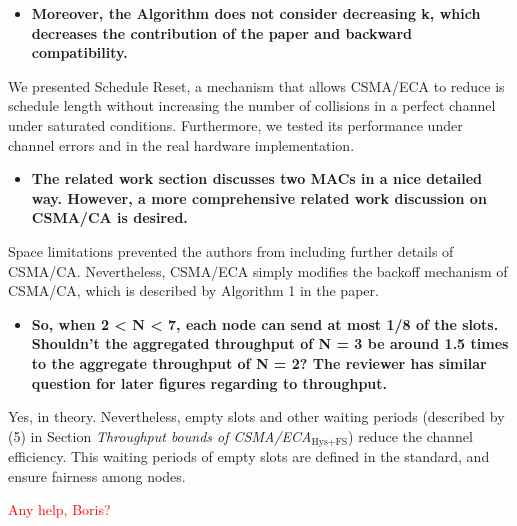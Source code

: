 \documentclass[]{article}
\begin{document}
		\begin{itemize}
			\item {\bfseries Moreover, the Algorithm does not consider decreasing k, which decreases the contribution of the paper and backward compatibility.}
		\end{itemize}
		
		We presented Schedule Reset, a mechanism that allows CSMA/ECA to reduce is schedule length without increasing the number of collisions in a perfect channel under saturated conditions. Furthermore, we tested its performance under channel errors and in the real hardware implementation.
		
		\begin{itemize}
			\item {\bfseries The related work section discusses two MACs in a nice detailed way. However, a more comprehensive related work discussion on CSMA/CA is desired.}
		\end{itemize}
		
		Space limitations prevented the authors from including further details of CSMA/CA. Nevertheless, CSMA/ECA simply modifies the backoff mechanism of CSMA/CA, which is described by Algorithm 1 in the paper.
		
		\begin{itemize}
			\item {\bfseries So, when 2 < N < 7, each node can send at most 1/8 of the slots. Shouldn't the aggregated throughput of N = 3 be around 1.5 times to the aggregate throughput of N = 2? The reviewer has similar question for later figures regarding to throughput.}
		\end{itemize}
		
		Yes, in theory. Nevertheless, empty slots and other waiting periods (described by (5) in Section \emph{Throughput bounds of CSMA/ECA$_{\text{Hys+FS}}$}) reduce the channel efficiency. This waiting periods of empty slots are defined in the standard, and ensure fairness among nodes.
		
		\textcolor{red}{Any help, Boris?}
		
\end{document}
